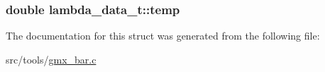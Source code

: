 \hypertarget{structlambda__data__t_ae4758334717032942626072636862f7a}{
\subsubsection[{temp}]{\setlength{\rightskip}{0pt plus 5cm}double {\bf lambda\-\_\-data\-\_\-t\-::temp}}}\label{structlambda__data__t_ae4758334717032942626072636862f7a}


\-The documentation for this struct was generated from the following file\-:\begin{DoxyCompactItemize}
\item 
src/tools/\hyperlink{gmx__bar_8c}{gmx\-\_\-bar.\-c}\end{DoxyCompactItemize}
